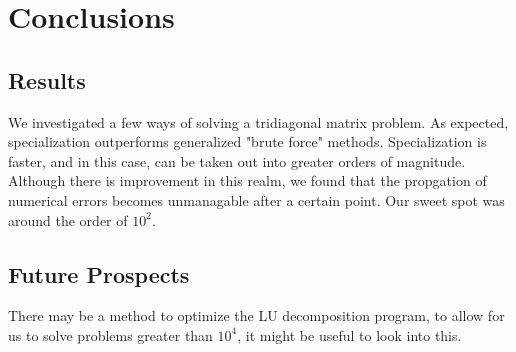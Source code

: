 \documentclass[10pt,showpacs,preprintnumbers,footinbib,amsmath,amssymb,aps,prl,twocolumn,groupedaddress,superscriptaddress,showkeys]{revtex4-1}
\begin{document}
\section{Conclusions}
	\subsection{Results}
	We investigated a few ways of solving a tridiagonal matrix problem. As expected, specialization outperforms generalized "brute force" methods. Specialization is faster, and in this case, can be taken out into greater orders of magnitude. Although there is improvement in this realm, we found that the propgation of numerical errors becomes unmanagable after a certain point. Our sweet spot was around the order of $10^{2}$.

	\subsection{Future Prospects}
	There may be a method to optimize the LU decomposition program, to allow for us to solve problems greater than $10^{4}$, it might be useful to look into this. 
\end{document}
